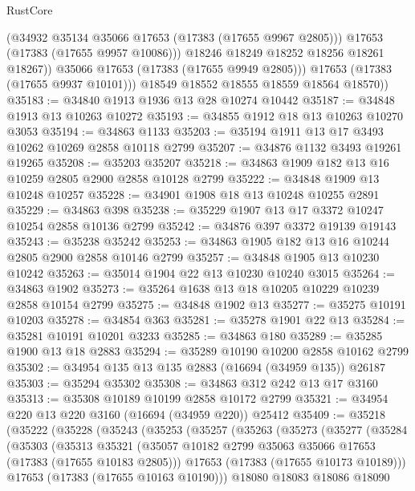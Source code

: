 \begin{lexlean}{RustCore}
\begin{coremodule}
                  (@34932 @35134 @35066 @17653 (@17383 (@17655 @9967 @2805)))
                  @17653
                  (@17383 (@17655 @9957 @10086)))
                @18246
                @18249
                @18252
                @18256
                @18261
                @18267))
            @35066
            @17653
            (@17383 (@17655 @9949 @2805)))
          @17653
          (@17383 (@17655 @9937 @10101)))
        @18549
        @18552
        @18555
        @18559
        @18564
        @18570))
@35183 := @34840 @1913 @1936 @13 @28 @10274 @10442
@35187 := @34848 @1913 @13 @10263 @10272
@35193 := @34855 @1912 @18 @13 @10263 @10270 @3053
@35194 := @34863 @1133
@35203 := @35194 @1911 @13 @17 @3493 @10262 @10269 @2858 @10118 @2799
@35207 := @34876 @1132 @3493 @19261 @19265
@35208 := @35203 @35207
@35218 := @34863 @1909 @182 @13 @16 @10259 @2805 @2900 @2858 @10128 @2799
@35222 := @34848 @1909 @13 @10248 @10257
@35228 := @34901 @1908 @18 @13 @10248 @10255 @2891
@35229 := @34863 @398
@35238 := @35229 @1907 @13 @17 @3372 @10247 @10254 @2858 @10136 @2799
@35242 := @34876 @397 @3372 @19139 @19143
@35243 := @35238 @35242
@35253 := @34863 @1905 @182 @13 @16 @10244 @2805 @2900 @2858 @10146 @2799
@35257 := @34848 @1905 @13 @10230 @10242
@35263 := @35014 @1904 @22 @13 @10230 @10240 @3015
@35264 := @34863 @1902
@35273 := @35264 @1638 @13 @18 @10205 @10229 @10239 @2858 @10154 @2799
@35275 := @34848 @1902 @13
@35277 := @35275 @10191 @10203
@35278 := @34854 @363
@35281 := @35278 @1901 @22 @13
@35284 := @35281 @10191 @10201 @3233
@35285 := @34863 @180
@35289 := @35285 @1900 @13 @18 @2883
@35294 := @35289 @10190 @10200 @2858 @10162 @2799
@35302 := @34954 @135 @13 @135 @2883 (@16694 (@34959 @135)) @26187
@35303 := @35294 @35302
@35308 := @34863 @312 @242 @13 @17 @3160
@35313 := @35308 @10189 @10199 @2858 @10172 @2799
@35321 := @34954 @220 @13 @220 @3160 (@16694 (@34959 @220)) @25412
@35409 := @35218
    (@35222
      (@35228
        (@35243
          (@35253
            (@35257
              (@35263
                (@35273
                  (@35277
                    (@35284
                      (@35303
                        (@35313
                          @35321
                          (@35057 @10182 @2799 @35063 @35066 @17653 (@17383 (@17655 @10183 @2805)))
                          @17653
                          (@17383 (@17655 @10173 @10189)))
                        @17653
                        (@17383 (@17655 @10163 @10190)))
                      @18080
                      @18083
                      @18086
                      @18090

\end{coremodule}
\end{lexlean}
